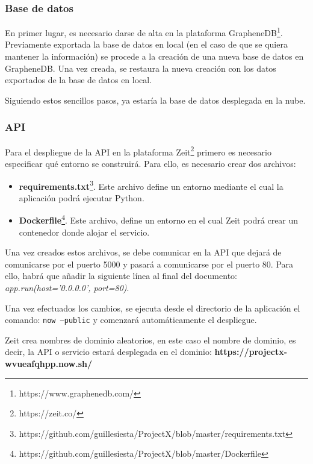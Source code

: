 \subsubsection{Base de datos}
En primer lugar, es necesario darse  de alta en la plataforma GrapheneDB\footnote{https://www.graphenedb.com/}. Previamente exportada la base de datos en local (en el caso de que se quiera mantener la información) se procede a la creación de una nueva base de datos en GrapheneDB. Una vez creada, se restaura la nueva creación con los datos exportados de la base de datos en local\cite{graphenedb}.

Siguiendo estos sencillos pasos, ya estaría la base de datos desplegada en la nube.


\subsubsection{API}

Para el despliegue de la API en la plataforma Zeit\footnote{https://zeit.co/} primero es necesario especificar qué entorno se construirá. Para ello, es necesario crear dos archivos:

\begin{itemize}
    \item \textbf{requirements.txt}\footnote{https://github.com/guillesiesta/ProjectX/blob/master/requirements.txt}. Este archivo define un entorno mediante el cual la aplicación podrá ejecutar Python.
    
    \item \textbf{Dockerfile}\footnote{https://github.com/guillesiesta/ProjectX/blob/master/Dockerfile}. Este archivo,  define un entorno en el cual Zeit podrá crear un contenedor donde alojar el servicio.
\end{itemize}

Una vez creados estos archivos, se debe comunicar en la API que dejará de comunicarse por el puerto 5000 y pasará a comunicarse por el puerto 80. Para ello, habrá que añadir la siguiente línea al final del documento: \textit{app.run(host='0.0.0.0', port=80)}.

Una vez efectuados los cambios, se ejecuta desde el directorio de la aplicación el comando: \texttt{now --public} y comenzará automáticamente el despliegue. 

Zeit crea nombres de dominio aleatorios, en este caso el nombre de dominio, es decir, la API o servicio estará desplegada en el dominio: \textbf{https://projectx-wvueafqhpp.now.sh/}

